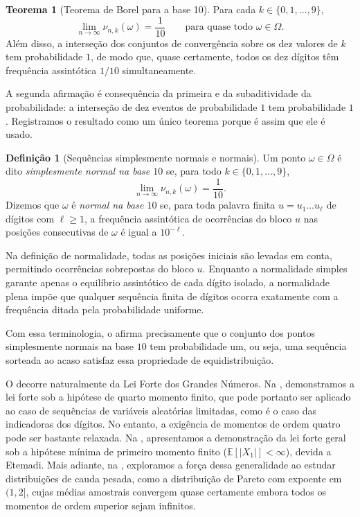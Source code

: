 \documentclass[12pt,portuguese]{article}
\theoremstyle{definition}
\newtheorem{theorem}{Teorema}
\newtheorem{definition}[definition]{Definição}
\theoremstyle{plainexercise}
\theoremstyle{starredexercise}
\theoremstyle{definition}
\begin{document}
\begin{theorem}[Teorema de Borel para a base 10]\label{thm:borel}
Para cada $k\in\{0,1,\ldots,9\}$,
\[
\lim_{n\to\infty}\nu_{n,k}(\omega)=\frac{1}{10}
\qquad\text{para quase todo }\omega\in\Omega.
\]
Além disso, a interseção dos conjuntos de convergência sobre os dez valores de
$k$ tem probabilidade $1$, de modo que, quase certamente, todos os dez dígitos
têm frequência assintótica $1/10$ simultaneamente.
\end{theorem}

A segunda afirmação é consequência da primeira e da subaditividade da
probabilidade: a interseção de dez eventos de probabilidade $1$ tem
probabilidade $1$. Registramos o resultado como um único teorema porque é assim
que ele é usado.

\begin{definition}[Sequências simplesmente normais e normais]\label{def:normal}
Um ponto $\omega\in\Omega$ é dito \emph{simplesmente normal na base $10$} se,
para todo $k\in\{0,1,\ldots,9\}$,
\[
\lim_{n\to\infty}\nu_{n,k}(\omega)=\frac{1}{10}.
\]
Dizemos que $\omega$ é \emph{normal na base $10$} se, para toda palavra finita
$u=u_1\ldots u_\ell$ de dígitos com $\ell\geqslant1$, a frequência assintótica
de ocorrências do bloco $u$ nas posições consecutivas de $\omega$ é igual a
$10^{-\ell}$.
\end{definition}

Na definição de normalidade, todas as posições iniciais são levadas em conta,
permitindo ocorrências sobrepostas do bloco $u$. Enquanto a normalidade simples
garante apenas o equilíbrio assintótico de cada dígito isolado, a normalidade
plena impõe que qualquer sequência finita de dígitos ocorra exatamente com a
frequência ditada pela probabilidade uniforme.

Com essa terminologia, o  afirma precisamente que o conjunto dos
pontos simplesmente normais na base $10$ tem probabilidade um, ou seja, 
uma sequência sorteada ao acaso satisfaz essa propriedade de
equidistribuição.

O  decorre naturalmente da Lei Forte dos Grandes Números. Na
, demonstramos a lei forte sob a hipótese de quarto
momento finito, que pode portanto ser aplicado ao caso de sequências de
variáveis aleatórias limitadas, como é o caso das indicadoras dos dígitos.
No entanto, a exigência de momentos de ordem quatro pode ser bastante relaxada. Na
, apresentamos a demonstração da lei forte geral sob a
hipótese mínima de primeiro momento finito ($\mathbb{E}[|X_1|]<\infty$), devida a
Etemadi. Mais adiante, na , exploramos a força dessa
generalidade ao estudar distribuições de cauda pesada, como a distribuição de
Pareto com expoente em $(1,2]$, cujas médias amostrais convergem quase
certamente embora todos os momentos de ordem superior sejam infinitos.
\end{document}
